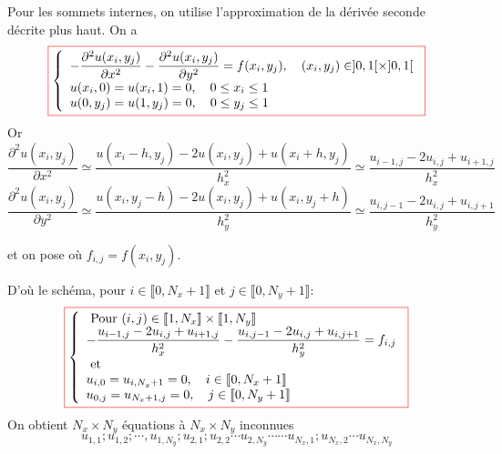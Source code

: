\documentclass{beamer}
\newcommand{\myredbox}[1]{\fcolorbox{red}{white}{$\displaystyle#1$}}
\begin{document}
 
 \begin{frame}

 Pour les sommets internes, on utilise l'approximation  de la dérivée seconde décrite plus haut. On a
\begin{equation}
\myredbox{\left\{\begin{array}{l}
{\displaystyle -\frac{\partial ^2 u(x_i,y_j)}{\partial  x^2}-\frac{\partial ^2 u(x_i,y_j)}{\partial  y^2} }=f(x_i,y_j), \quad (x_i,y_j)\in  ]0,1[  \times ]0,1[\\
u(x_i,0)=u(x_i,1)=0,\quad 0\leq x_i\leq 1\\
u(0,y_j)=u(1,y_j)=0,\quad 0\leq y_j \leq 1
\end{array}\right.}
\end{equation}
Or
\[\frac{\partial ^2 u(x_i,y_j)}{\partial  x^2}\simeq \frac{u(x_i-h,y_j)-2u(x_i,y_j)+u(x_i+h,y_j)}{h_x^2}\simeq \frac{u_{i-1,j}-2u_{i,j}+u_{i+1,j}}{h_x^2}\] 
\[\frac{\partial ^2 u(x_i,y_j)}{\partial  y^2}\simeq \frac{u(x_i,y_j-h)-2u(x_i,y_j)+u(x_i,y_j+h)}{h_y^2}\simeq \frac{u_{i,j-1}-2u_{i,j}+u_{i,j+1}}{h_y^2}\] 
 
 et on pose où $f_{i,j}=f(x_i,y_j)$.
 \end{frame}
 
 
 \begin{frame}
D'où le schéma, pour $i\in  \llbracket 0,N_x+1\rrbracket$ et $j\in  \llbracket 0,N_y+1\rrbracket$:
\begin{equation}
\myredbox{\left\{\begin{array}{l}
\mbox{ Pour } (i,j)\in  \llbracket 1,N_x\rrbracket \times \llbracket 1,N_y\rrbracket\\
{\displaystyle -\frac{u_{i-1,j}-2u_{i,j}+u_{i+1,j}}{h_x^2}-\frac{u_{i,j-1}-2u_{i,j}+u_{i,j+1}}{h_y^2} }=f_{i,j} \\
\mbox{ et } \\
u_{i,0}=u_{i,N_y+1}=0,\quad i\in  \llbracket 0,N_x+1\rrbracket\\
u_{0,j}=u_{N_x+1,j}=0,\quad j\in  \llbracket 0,N_y+1\rrbracket
\end{array}\right.}
\end{equation}
On obtient $N_x\times N_y$ équations à $N_x\times N_y$ inconnues 
\[u_{1,1}; u_{1,2}; \cdots , u_{1,N_y}; u_{2,1}; u_{2,2} \cdots  u_{2,N_y} \cdots    \cdots    u_{N_x,1};u_{N_x,2} \cdots  u_{N_x,N_y}\]
 \end{frame}
 
\end{document}
